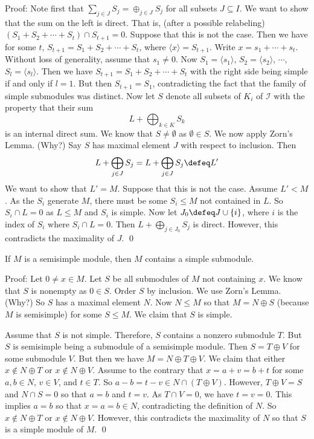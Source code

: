 Proof: Note first that $\sum_{j \in J} S_j = \oplus_{j \in J} S_j$ for all subsets $J \subseteq I$. We want to show that the sum on the left is direct. That is, (after a possible relabeling) $(S_1+S_2+\cdots+S_t) \cap S_{t+1}=0$. Suppose that this is not the case. Then we have for some $t$, $S_{t+1}=S_1+S_2+\cdots+S_t$, where $\langle x \rangle=S_{t+1}$. Write $x=s_1+\cdots+s_t$. Without loss of generality, assume that $s_1 \neq 0$. Now $S_1=\langle s_1 \rangle$, $S_2 =\langle s_2 \rangle$, $\cdots$, $S_l=\langle s_l \rangle$. Then we have $S_{t+1}=S_1+S_2+\cdots+S_t$ with the right side being simple if and only if $l=1$. But then $S_{t+1}=S_1$, contradicting the fact that the family of simple submodules was distinct. Now let $S$ denote all subsets of $K_i$ of $\mathcal{I}$ with the property that their sum
\[
L+ \bigoplus_{k \in K} S_k
\]
is an internal direct sum. We know that $S\neq \emptyset$ as $\emptyset \in S$. We now apply Zorn's Lemma. (Why?) Say $S$ has maximal element $J$ with respect to inclusion. Then 
\[
L+\bigoplus_{j \in J} S_j = L+\bigoplus_{j \in J} S_j \defeq L'
\]
We want to show that $L'=M$. Suppose that this is not the case. Assume $L' <M$. As the $S_i$ generate $M$, there must be some $S_i \leq M$ not contained in $L$.  So $S_i \cap L=0$ as $L \leq M$ and $S_i$ is simple. Now let $J_0\defeq J \cup \{i\}$, where $i$ is the index of $S_i$ where $S_i \cap L =0$. Then $L+\bigoplus_{j \in J_0} S_j$ is direct. However, this contradicts the maximality of $J$. \qed \\

\begin{lem}
If $M$ is a semisimple module, then $M$ contains a simple submodule.
\end{lem}

Proof: Let $0 \neq x \in M$. Let $S$ be all submodules of $M$ not containing $x$. We know that $S$ is nonempty as $0 \in S$. Order $S$ by inclusion. We use Zorn's Lemma. (Why?) So $S$ has a maximal element  $N$. Now $N \leq M$ so that $M=N \oplus S$ (because $M$ is semisimple) for some $S \leq M$. We claim that $S$ is simple. 

Assume that $S$ is not simple. Therefore, $S$ contains a nonzero submodule $T$. But $S$ is semisimple being a submodule of a semisimple module. Then $S=T \oplus V$ for some submodule $V$. But then we have $M=N \oplus T \oplus V$. We claim that either $x\notin N \oplus T$ or $x\notin N \oplus V$. Assume to the contrary that $x=a+v=b+t$ for some $a,b \in N$, $v \in V$, and $t \in T$. So $a-b=t-v \in N \cap (T \oplus V)$. However, $T \oplus V=S$ and $N \cap S=0$ so that $a=b$ and $t=v$. As $T \cap V=0$, we have $t=v=0$. This implies $a=b$ so that $x=a=b \in N$, contradicting the definition of $N$. So $x \notin N \oplus T$ or $x \notin N \oplus V$. However, this contradicts the maximality of $N$ so that $S$ is a simple module of $M$. \qed \\

